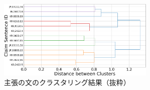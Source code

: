 \documentclass[a4paper, twocolumn, 10pt]{jarticle}
\begin{document}
\begin{figure}[H]
	\centering
	\includegraphics[keepaspectratio, width=75mm]{img/process-07_sentences-cluster_from-cluster-230_with-threshold-85_color_dendrogram_reduced-data-to-5000_y-100_Trim.png}
	\caption{
    主張の文のクラスタリング結果（抜粋）
  }
	\label{claim_sentences_dendrogram}
\end{figure}
\vspace{-3.0mm}


\end{document}
